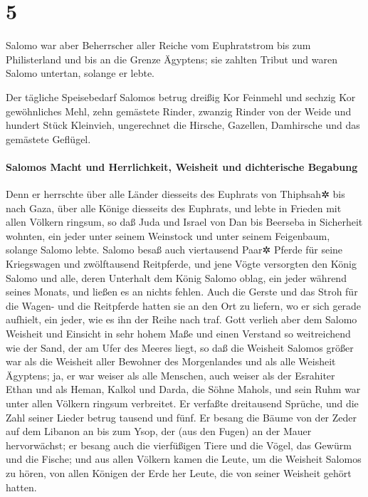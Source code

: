 \hypertarget{section-4}{%
\section{5}\label{section-4}}

Salomo war aber Beherrscher aller Reiche vom Euphratstrom
bis zum Philisterland und bis an die Grenze Ägyptens; sie zahlten Tribut
und waren Salomo untertan, solange er lebte.

Der tägliche Speisebedarf Salomos betrug dreißig Kor
Feinmehl und sechzig Kor gewöhnliches Mehl, zehn gemästete
Rinder, zwanzig Rinder von der Weide und hundert Stück Kleinvieh,
ungerechnet die Hirsche, Gazellen, Damhirsche und das gemästete
Geflügel.

\hypertarget{salomos-macht-und-herrlichkeit-weisheit-und-dichterische-begabung}{%
\paragraph{Salomos Macht und Herrlichkeit, Weisheit und dichterische
Begabung}\label{salomos-macht-und-herrlichkeit-weisheit-und-dichterische-begabung}}

Denn er herrschte über alle Länder diesseits des Euphrats
von Thiphsah✲ bis nach Gaza, über alle Könige diesseits des Euphrats,
und lebte in Frieden mit allen Völkern ringsum, so daß
Juda und Israel von Dan bis Beerseba in Sicherheit wohnten, ein jeder
unter seinem Weinstock und unter seinem Feigenbaum, solange Salomo
lebte. Salomo besaß auch viertausend Paar✲ Pferde für
seine Kriegswagen und zwölftausend Reitpferde, und jene
Vögte versorgten den König Salomo und alle, deren Unterhalt dem König
Salomo oblag, ein jeder während seines Monats, und ließen es an nichts
fehlen. Auch die Gerste und das Stroh für die Wagen- und
die Reitpferde hatten sie an den Ort zu liefern, wo er sich gerade
aufhielt, ein jeder, wie es ihn der Reihe nach traf. Gott
verlieh aber dem Salomo Weisheit und Einsicht in sehr hohem Maße und
einen Verstand so weitreichend wie der Sand, der am Ufer des Meeres
liegt, so daß die Weisheit Salomos größer war als die
Weisheit aller Bewohner des Morgenlandes und als alle Weisheit Ägyptens;
ja, er war weiser als alle Menschen, auch weiser als der
Esrahiter Ethan und als Heman, Kalkol und Darda, die Söhne Mahols, und
sein Ruhm war unter allen Völkern ringsum verbreitet. Er
verfaßte dreitausend Sprüche, und die Zahl seiner Lieder betrug tausend
und fünf. Er besang die Bäume von der Zeder auf dem
Libanon an bis zum Ysop, der (aus den Fugen) an der Mauer hervorwächst;
er besang auch die vierfüßigen Tiere und die Vögel, das Gewürm und die
Fische; und aus allen Völkern kamen die Leute, um die
Weisheit Salomos zu hören, von allen Königen der Erde her Leute, die von
seiner Weisheit gehört hatten.

